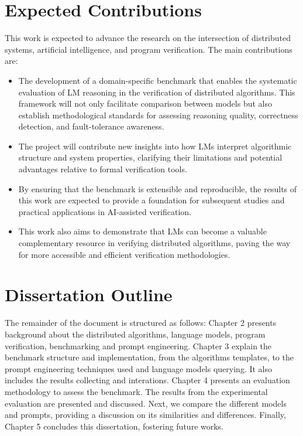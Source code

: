 \section{Expected Contributions}

This work is expected to advance the research on the intersection of distributed systems, artificial intelligence, and program verification. The main contributions are:
\begin{itemize}
\item The development of a domain-specific benchmark that enables the systematic evaluation of LM reasoning in the verification of distributed algorithms. This framework will not only facilitate comparison between models but also establish methodological standards for assessing reasoning quality, correctness detection, and fault-tolerance awareness.
\item The project will contribute new insights into how LMs interpret algorithmic structure and system properties, clarifying their limitations and potential advantages relative to formal verification tools. 
\item By ensuring that the benchmark is extensible and reproducible, the results of this work are expected to provide a foundation for subsequent studies and practical applications in AI-assisted verification. 
\item This work also aims to demonstrate that LMs can become a valuable complementary resource in verifying distributed algorithms, paving the way for more accessible and efficient verification methodologies.
\end{itemize} 

\section{Dissertation Outline}
The remainder of the document is structured as follows: Chapter 2 presents background about
the distributed algorithms, language models, program verification, benchmarking and prompt engineering. Chapter 3
explain the benchmark structure and implementation, from the algorithms templates, to the prompt engineering techniques used and language models querying. It also includes the results collecting and interations. Chapter 4 presents an evaluation methodology to assess
the benchmark. The results from the experimental evaluation
are presented and discussed. Next, we compare the different models and prompts, providing
a discussion on its similarities and differences. Finally, Chapter 5 concludes this dissertation,
fostering future works.

